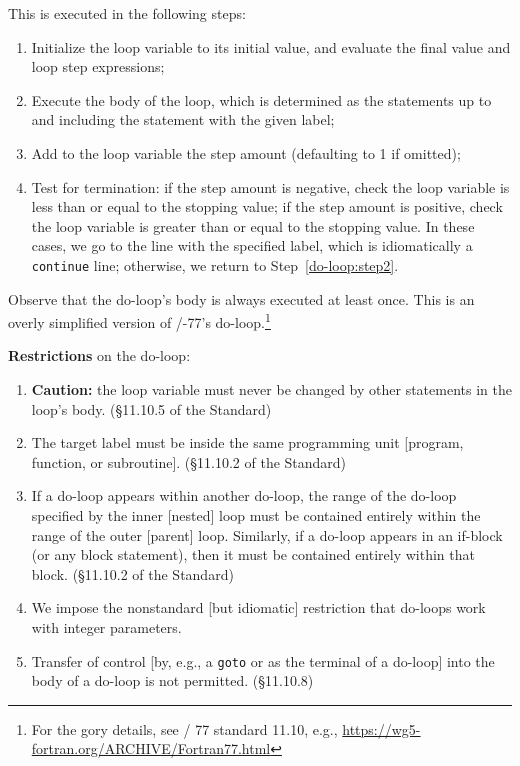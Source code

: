 This is executed in the following steps:
\begin{enumerate}
\item Initialize the loop variable to its initial value, and evaluate
  the final value and loop step expressions;
\item\label{do-loop:step2} Execute the body of the loop, which is
  determined as the statements up to and including the statement with
  the given label;
\item Add to the loop variable the step amount (defaulting to 1 if omitted);
\item Test for termination: if the step amount is negative, check the
  loop variable is less than or equal to the stopping value; if the step
  amount is positive, check the loop variable is greater than or equal
  to the stopping value. In these cases, we go to the line with the
  specified label, which is idiomatically a \texttt{continue} line;
  otherwise, we return to Step~\ref{do-loop:step2}.
\end{enumerate}
Observe that the do-loop's body is always executed at least once.
This is an overly simplified version of \FORTRAN/-77's
do-loop.\footnote{For the gory details, see \FORTRAN/ 77 standard 11.10,
e.g., \url{https://wg5-fortran.org/ARCHIVE/Fortran77.html}}

\textbf{Restrictions} on the do-loop:
\begin{enumerate}
\item \textbf{Caution:} the loop variable must never be changed by other
statements in the loop's body. (\S11.10.5 of the Standard)
\item The target label must be inside the same programming unit
  [program, function, or subroutine]. (\S11.10.2 of the Standard)
\item If a do-loop appears within another do-loop, the range of the
  do-loop specified by the inner [nested] loop must be contained
  entirely within the range of the outer [parent] loop. Similarly, if a
  do-loop appears in an if-block (or any block statement), then it must
  be contained entirely within that block. (\S11.10.2 of the Standard)
\item We impose the nonstandard [but idiomatic] restriction that
  do-loops work with integer parameters.
\item Transfer of control [by, e.g., a \texttt{goto} or as the terminal
  of a do-loop] into the body of a do-loop is not permitted. (\S11.10.8)
\end{enumerate}

